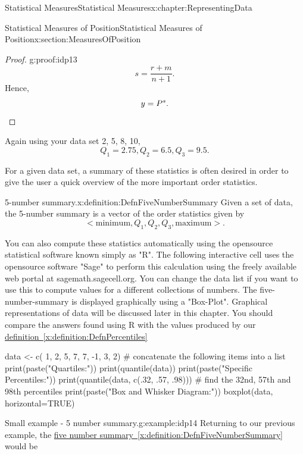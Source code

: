 \documentclass[oneside,10pt,]{book}
\newcommand{\xreffont}{\relax}
\newcommand{\qedhere}{\relax}
\numberwithin{equation}{section}
\newcommand{\lt}{<}
\newcommand{\gt}{>}
\begin{document}
\begin{chapterptx}{Statistical Measures}{}{Statistical Measures}{}{}{x:chapter:RepresentingData}
\begin{sectionptx}{Statistical Measures of Position}{}{Statistical Measures of Position}{}{}{x:section:MeasuresOfPosition}
\begin{proof}{}{g:proof:idp13}
\begin{equation*}
s = \frac{r+m}{n+1}.
\end{equation*}
Hence,%
\begin{equation*}
y = P^s. \qedhere
\end{equation*}
\end{proof}
Again using your data set \textbraceleft{}2, 5, 8, 10\textbraceright{},%
\begin{equation*}
Q_1 = 2.75, Q_2 = 6.5, Q_3 = 9.5.
\end{equation*}
%
\par
For a given data set, a summary of these statistics is often desired in order to give the user a quick overview of the more important order statistics.%
\begin{definition}{5-number summary.}{x:definition:DefnFiveNumberSummary}%
Given a set of data, the 5-number summary is a vector of the order statistics given by%
\begin{equation*}
\lt \text{minimum}, Q_1, Q_2, Q_3, \text{maximum} \gt .
\end{equation*}
%
\end{definition}
You can also compute these statistics automatically using the opensource statistical software known simply as "R".  The following interactive cell uses the opensource software "Sage" to perform this calculation using the freely available web portal at sagemath.sagecell.org. You can change the data list if you want to use this to compute values for a different collections of numbers. The five-number-summary is displayed graphically using a "Box-Plot". Graphical representations of data will be discussed later in this chapter. You should compare the answers found using R with the values produced by our \hyperref[x:definition:DefnPercentiles]{definition~{\xreffont\ref{x:definition:DefnPercentiles}}}%
\begin{sageinput}
data <- c( 1, 2, 5, 7, 7, -1, 3, 2)   # concatenate the following items into a list
print(paste("Quartiles:"))
print(quantile(data))
print(paste("Specific Percentiles:"))
print(quantile(data, c(.32, .57, .98)))   # find the 32nd, 57th and 98th percentiles
print(paste("Box and Whisker Diagram:"))
boxplot(data, horizontal=TRUE)
\end{sageinput}
\begin{example}{Small example - 5 number summary.}{g:example:idp14}%
Returning to our previous example, the \hyperref[x:definition:DefnFiveNumberSummary]{five number summary~{\xreffont\ref{x:definition:DefnFiveNumberSummary}}} would be%
\begin{equation*}

\end{equation*}
\end{example}
\end{sectionptx}
\end{chapterptx}
\end{document}
